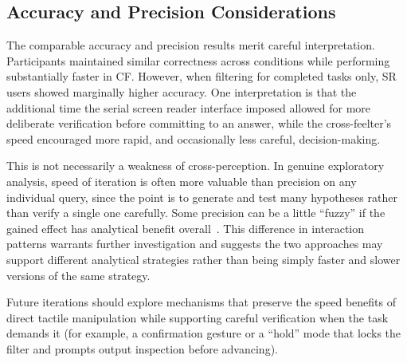 \documentclass[12pt]{cmuthesis}
\begin{document}
\subsection{Accuracy and Precision Considerations}
\label{sec:discussion-accuracy}


The comparable accuracy and precision results merit careful interpretation. Participants maintained similar correctness across conditions while performing substantially faster in CF. However, when filtering for completed tasks only, SR users showed marginally higher accuracy. One interpretation is that the additional time the serial screen reader interface imposed allowed for more deliberate verification before committing to an answer, while the cross-feelter's speed encouraged more rapid, and occasionally less careful, decision-making.

This is not necessarily a weakness of cross-perception. In genuine exploratory analysis, speed of iteration is often more valuable than precision on any individual query, since the point is to generate and test many hypotheses rather than verify a single one carefully. Some precision can be a little ``fuzzy'' if the gained effect has analytical benefit overall~\cite{Jiang1994}. This difference in interaction patterns warrants further investigation and suggests the two approaches may support different analytical strategies rather than being simply faster and slower versions of the same strategy.

Future iterations should explore mechanisms that preserve the speed benefits of direct tactile manipulation while supporting careful verification when the task demands it (for example, a confirmation gesture or a ``hold'' mode that locks the filter and prompts output inspection before advancing). 

\end{document}
